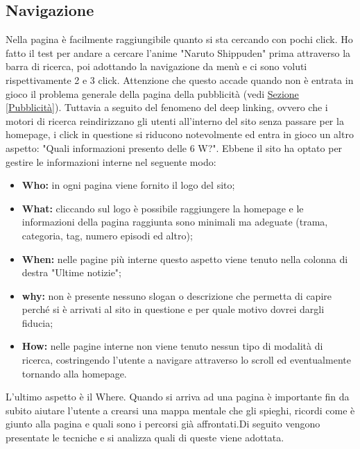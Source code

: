 \subsection{Navigazione}
Nella pagina è facilmente raggiungibile quanto si sta cercando con pochi click. Ho fatto il test per andare a cercare l'anime "Naruto Shippuden" prima attraverso la barra di ricerca, poi adottando la navigazione da menù e ci sono voluti rispettivamente 2 e 3 click. Attenzione che questo accade quando non è entrata in gioco il problema generale della pagina della pubblicità (vedi \hyperref[Pubblicità]{Sezione \ref{Pubblicità}}).
Tuttavia a seguito del fenomeno del deep linking, ovvero che i motori di ricerca reindirizzano gli utenti all'interno del sito senza passare per la homepage, i click in questione si riducono notevolmente ed entra in gioco un altro aspetto: "Quali informazioni presento delle 6 W?".
Ebbene il sito ha optato per gestire le informazioni interne nel seguente modo:
\begin{itemize}
	\item \textbf{Who:} in ogni pagina viene fornito il logo del sito;
	\item \textbf{What:} cliccando sul logo è possibile raggiungere la homepage e le informazioni della pagina raggiunta sono minimali ma adeguate (trama, categoria, tag, numero episodi ed altro);
	\item \textbf{When:} nelle pagine più interne questo aspetto viene tenuto nella colonna di destra "Ultime notizie";
	\item \textbf{why:} non è presente nessuno slogan o descrizione che permetta di capire perché si è arrivati al sito in questione e per quale motivo dovrei dargli fiducia;
	\item \textbf{How:} nelle pagine interne non viene tenuto nessun tipo di modalità di ricerca, costringendo l'utente a navigare attraverso lo scroll ed eventualmente tornando alla homepage. 
\end{itemize}
L'ultimo aspetto è il Where. Quando si arriva ad una pagina è importante fin da subito aiutare l'utente a crearsi una mappa mentale che gli spieghi, ricordi come è giunto alla pagina e quali sono i percorsi già affrontati.Di seguito vengono presentate le tecniche e si analizza quali di queste viene adottata.

\newpage

